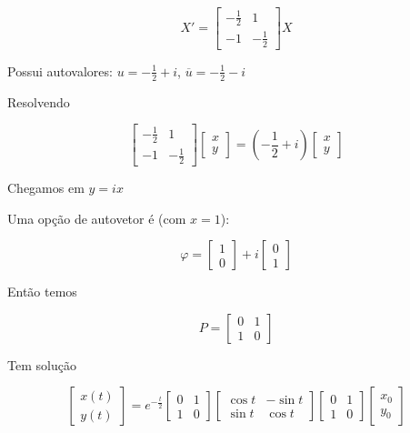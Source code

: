 \documentclass[12pt]{article}
\begin{document}
$$X' = \left [ \begin{array}{cc}
    -\frac{1}{2} & 1 \\
    -1 & -\frac{1}{2}
\end{array} \right ] X$$

Possui autovalores: $u = - \frac{1}{2} + i$, $\overline{u} = - \frac{1}{2} - i$

Resolvendo

$$\left [ \begin{array}{cc}
    - \frac{1}{2} & 1 \\
    -1 & - \frac{1}{2}
\end{array} \right ] \left [ \begin{array}{c}
    x \\
    y 
\end{array} \right ] = \left (- \frac{1}{2} + i \right ) \left [ \begin{array}{c}
    x \\
    y 
\end{array} \right ]$$

Chegamos em $y = i x$

Uma opção de autovetor é (com $x = 1$):

$$\varphi = \left [ \begin{array}{c}
    1 \\
    0 
\end{array} \right ] + i \left [ \begin{array}{c}
    0 \\
    1 
\end{array} \right ]$$

Então temos

$$P = \left [ \begin{array}{cc}
    0 & 1 \\
    1 & 0
\end{array} \right ]$$

Tem solução

$$\left [ \begin{array}{c}
    x(t) \\
    y(t) 
\end{array} \right ] = e^{- \frac{t}{2}} \left [ \begin{array}{cc}
    0 & 1 \\
    1 & 0
\end{array} \right ] \left [ \begin{array}{cc}
    \cos{t} & - \sin{t} \\
    \sin{t} & \cos{t}
\end{array} \right ] \left [ \begin{array}{cc}
    0 & 1 \\
    1 & 0
\end{array} \right ] \left [ \begin{array}{c}
    x_0 \\
    y_0
\end{array} \right ]$$
\end{document}
